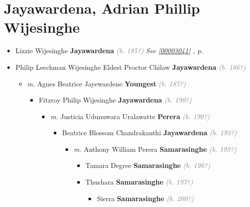 \documentclass[10pt, openany]{book}
\begin{document}
\chapter{Jayawardena, Adrian Phillip Wijesinghe}
\label{00003016}
\textcolor{slmaroon}{\textit{}}
\begin{itemize}
\item{Lizzie Wijesinghe \textbf{Jayawardena} \textcolor{gray}{\textit{(b. 185?)}} \textcolor{slteal}{\textit{See  \autoref{00003041} \textit{, p. \pageref{00003041} }}}}
\item{Philip Leechman Wijesinghe Eldest Proctor Chilaw \textbf{Jayawardena} \textcolor{gray}{\textit{(b. 186?)}}
\begin{itemize}
\item{\textit{m.} Agnes Beatrice Jayewardene \textbf{Youngest} \textcolor{gray}{\textit{(b. 187?)}}   \label{couple:00003017:00003018} \begin{itemize}
\item{Fitzroy Philip Wijesinghe \textbf{Jayawardena} \textcolor{gray}{\textit{(b. 190?)}}
\begin{itemize}
\item{\textit{m.} Justicia Udunuwara Uralawatte \textbf{Perera} \textcolor{gray}{\textit{(b. 190?)}}   \label{couple:00003023:00003024} \begin{itemize}
\item{Beatrice Blossom Chandrakanthi \textbf{Jayawardena} \textcolor{gray}{\textit{(b. 193?)}}
\begin{itemize}
\item{\textit{m.} Anthony William Perera \textbf{Samarasinghe} \textcolor{gray}{\textit{(b. 193?)}}   \label{couple:00003025:00003026} \begin{itemize}
\item{Tamara Degree \textbf{Samarasinghe} \textcolor{gray}{\textit{(b. 196?)}}
  }
\item{Thushara \textbf{Samarasinghe} \textcolor{gray}{\textit{(b. 197?)}}
\begin{itemize}
\item{Sierra \textbf{Samarasinghe} \textcolor{gray}{\textit{(b. 200?)}}
 }
\end{itemize}
 }
\end{itemize}}
\end{itemize}
   }
\end{itemize}}

\end{itemize}}
\end{itemize}}
\end{itemize}}
\end{itemize}
\end{document}
